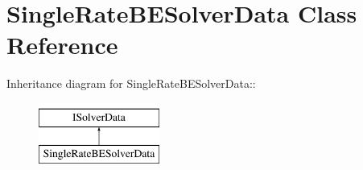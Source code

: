 \hypertarget{classSingleRateBESolverData}{
\section{SingleRateBESolverData Class Reference}
\label{classSingleRateBESolverData}
}
Inheritance diagram for SingleRateBESolverData::\begin{figure}[H]
\begin{center}
\leavevmode
\includegraphics[height=2cm]{classSingleRateBESolverData}
\end{center}
\end{figure}
